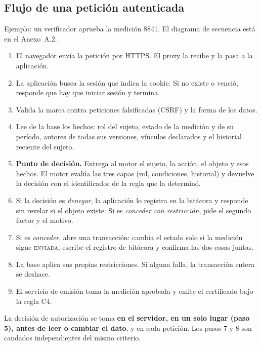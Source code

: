 \documentclass[11pt,letterpaper]{article}
\newcommand{\est}[1]{\textsc{\small #1}}
\begin{document}
\subsection{Flujo de una petición autenticada}
\label{sec:flujo}

Ejemplo: un verificador aprueba la medición 8841. El diagrama de secuencia está en el Anexo~A.2.

\begin{enumerate}
\item El navegador envía la petición por HTTPS. El proxy la recibe y la pasa a la aplicación.
\item La aplicación busca la sesión que indica la cookie. Si no existe o venció, responde que hay que
      iniciar sesión y termina.
\item Valida la marca contra peticiones falsificadas (CSRF) y la forma de los datos.
\item Lee de la base los hechos: rol del sujeto, estado de la medición y de su período, autores de
      todas sus versiones, vínculos declarados y el historial reciente del sujeto.
\item \textbf{Punto de decisión.} Entrega al motor el sujeto, la acción, el objeto y esos hechos. El
      motor evalúa las tres capas (rol, condiciones, historial) y devuelve la decisión con el
      identificador de la regla que la determinó.
\item Si la decisión es \emph{denegar}, la aplicación lo registra en la bitácora y responde sin revelar
      si el objeto existe. Si es \emph{conceder con restricción}, pide el segundo factor y el motivo.
\item Si es \emph{conceder}, abre una transacción: cambia el estado solo si la medición sigue
      \est{enviada}, escribe el registro de bitácora y confirma las dos cosas juntas.
\item La base aplica sus propias restricciones. Si alguna falla, la transacción entera se deshace.
\item El servicio de emisión toma la medición aprobada y emite el certificado bajo la regla C4.
\end{enumerate}

\begin{decision}
La decisión de autorización se toma \textbf{en el servidor, en un solo lugar (paso 5), antes de leer o
cambiar el dato}, y en cada petición. Los pasos 7 y 8 son candados independientes del mismo criterio.
\end{decision}

\end{document}
